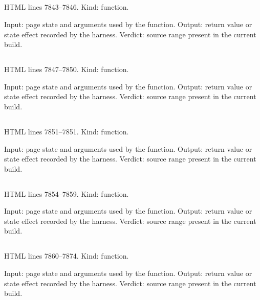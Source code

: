 \subsection*{\texttt{}}
\label{vf_392_mgScope}
HTML lines 7843--7846. Kind: function.

Input: page state and arguments used by the function.
Output: return value or state effect recorded by the harness.
Verdict: source range present in the current build.

\subsection*{\texttt{}}
\label{vf_393_mgScopeMark}
HTML lines 7847--7850. Kind: function.

Input: page state and arguments used by the function.
Output: return value or state effect recorded by the harness.
Verdict: source range present in the current build.

\subsection*{\texttt{}}
\label{vf_394_mgItemKey}
HTML lines 7851--7851. Kind: function.

Input: page state and arguments used by the function.
Output: return value or state effect recorded by the harness.
Verdict: source range present in the current build.

\subsection*{\texttt{}}
\label{vf_395_mgScopeFilter}
HTML lines 7854--7859. Kind: function.

Input: page state and arguments used by the function.
Output: return value or state effect recorded by the harness.
Verdict: source range present in the current build.

\subsection*{\texttt{}}
\label{vf_396_mgRefresh}
HTML lines 7860--7874. Kind: function.

Input: page state and arguments used by the function.
Output: return value or state effect recorded by the harness.
Verdict: source range present in the current build.

